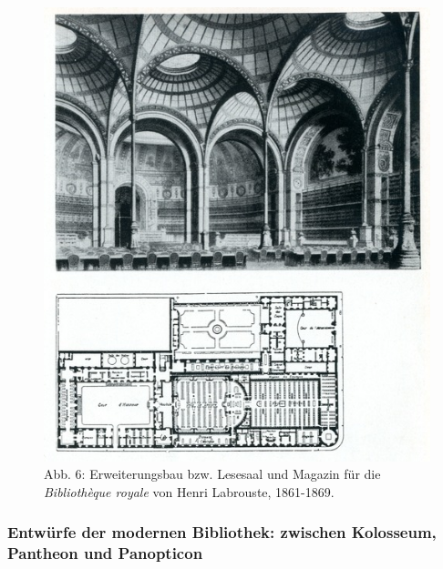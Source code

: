 \begin{figure}[htbp]
\centering
\includegraphics{img/wagner-6.jpg}
\caption{Abb. 6: Erweiterungsbau bzw. Lesesaal und Magazin für die
\emph{Bibliothèque royale} von Henri Labrouste, 1861-1869.}
\end{figure}

\subsubsection{Entwürfe der modernen Bibliothek: zwischen Kolosseum,
Pantheon und
Panopticon}\label{entwuxfcrfe-der-modernen-bibliothek-zwischen-kolosseum-pantheon-und-panopticon}

